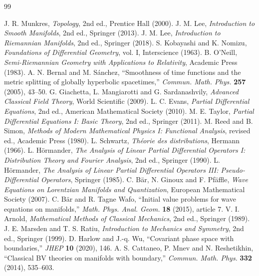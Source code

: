 \renewcommand{\bibname}{References}
\begin{thebibliography}{99}
 J. R. Munkres, \emph{Topology}, 2nd ed., Prentice Hall (2000).
 J. M. Lee, \emph{Introduction to Smooth Manifolds}, 2nd ed., Springer (2013).
 J. M. Lee, \emph{Introduction to Riemannian Manifolds}, 2nd ed., Springer (2018).
 S. Kobayashi and K. Nomizu, \emph{Foundations of Differential Geometry}, vol. I, Interscience (1963).
 B. O'Neill, \emph{Semi-Riemannian Geometry with Applications to Relativity}, Academic Press (1983).
 A. N. Bernal and M. S\'anchez, ``Smoothness of time functions and the metric splitting of globally hyperbolic spacetimes,'' \emph{Commun. Math. Phys.} \textbf{257} (2005), 43--50.
 G. Giachetta, L. Mangiarotti and G. Sardanashvily, \emph{Advanced Classical Field Theory}, World Scientific (2009).
 L. C. Evans, \emph{Partial Differential Equations}, 2nd ed., American Mathematical Society (2010).
 M. E. Taylor, \emph{Partial Differential Equations I: Basic Theory}, 2nd ed., Springer (2011).
 M. Reed and B. Simon, \emph{Methods of Modern Mathematical Physics I: Functional Analysis}, revised ed., Academic Press (1980).
 L. Schwartz, \emph{Th\'eorie des distributions}, Hermann (1966).
 L. H\"ormander, \emph{The Analysis of Linear Partial Differential Operators I: Distribution Theory and Fourier Analysis}, 2nd ed., Springer (1990).
 L. H\"ormander, \emph{The Analysis of Linear Partial Differential Operators III: Pseudo-Differential Operators}, Springer (1985).
 C. B\"ar, N. Ginoux and F. Pf\"affle, \emph{Wave Equations on Lorentzian Manifolds and Quantization}, European Mathematical Society (2007).
 C. B\"ar and R. Tagne Wafo, ``Initial value problems for wave equations on manifolds,'' \emph{Math. Phys. Anal. Geom.} \textbf{18} (2015), article 7.
 V. I. Arnold, \emph{Mathematical Methods of Classical Mechanics}, 2nd ed., Springer (1989).
 J. E. Marsden and T. S. Ratiu, \emph{Introduction to Mechanics and Symmetry}, 2nd ed., Springer (1999).
 D. Harlow and J.-q. Wu, ``Covariant phase space with boundaries,'' \emph{JHEP} \textbf{10} (2020), 146.
 A. S. Cattaneo, P. Mnev and N. Reshetikhin, ``Classical BV theories on manifolds with boundary,'' \emph{Commun. Math. Phys.} \textbf{332} (2014), 535--603.

\end{thebibliography}
